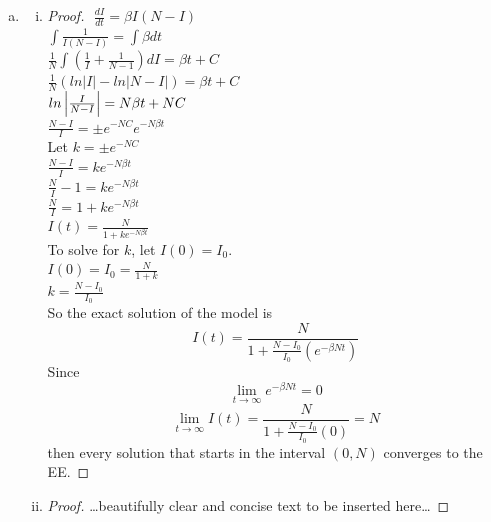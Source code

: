 \documentclass[12pt]{article}
\begin{document}
\begin{enumerate}[(a)]
\item \SIanalQb
  \begin{enumerate}[(i)]
  \item \SIanalQbi

    {\color{blue}
      \begin{proof}
        $ $\newline
      	$\frac{dI}{dt} = \beta I(N-I)$\\
      	$\int\frac{1}{I(N-I)} = \int\beta dt$\\
      	$\frac{1}{N}\int (\frac{1}{I} + \frac{1}{N-1})dI = \beta t + C$\\
      	$\frac{1}{N}(ln|I|- ln|N-I|) =\beta t + C$\\
      	$ln\left|\frac{I}{N-I}\right| = N \beta t + NC$\\
      	$\frac{N-I}{I} = \pm e^{-NC}e^{-N\beta t}$\\

      	Let $k = \pm e^{-NC}$\\
      	$\frac{N-I}{I} = ke^{-N\beta t}$\\
      	$\frac{N}{I} - 1 = ke^{-N\beta t}$\\
      	$\frac{N}{I} = 1 + ke^{-N\beta t}$\\
      	$I(t) = \frac{N}{1 + ke^{-N\beta t}}$\\

      	To solve for $k$, let $I(0) = I_0$.\\
      	$I(0) = I_0 = \frac{N}{1 + k}$\\
      	$k = \frac{N - I_0}{I_0}$\\

        So the exact solution of the model is
        \begin{equation}
          I(t) =  \frac{N}{1+\frac{N-I_0}{I_0}(e^{-\beta N t})}
        \end{equation}
        Since $$\lim_{t\to\infty} e^{-\beta N t} = 0$$
       $$\lim_{t\to\infty} I(t) = \frac{N}{1 +\frac{N-I_0}{I_0}(0)} = N$$
       then every solution that starts in the interval $(0, N)$ converges to the EE.
      \end{proof}
    }

  \item \SIanalQbii

    {\color{blue}
      \begin{proof}
        {\color{magenta}\dots beautifully clear and concise text to be inserted here\dots}
      \end{proof}
    }

  \end{enumerate}
\end{enumerate}
\end{document}
